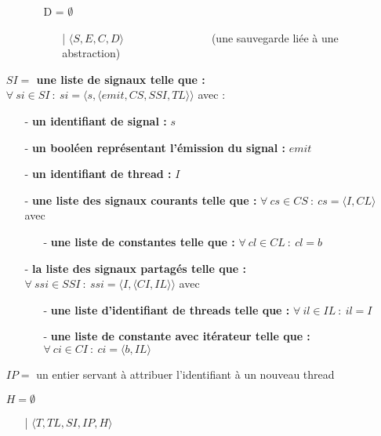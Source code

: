 \documentclass[10pt,a4paper]{report}
\begin{document}
\begin{itemize}
\begin{itemize}
\begin{itemize}
\begin{itemize}
				\end{itemize}
				\item[] D = $\emptyset$
				\begin{itemize}
					\item[|] $\langle S,E,C,D\rangle$~~~~~~~~~~~~~~~~(une sauvegarde liée à une abstraction)
				\end{itemize}
			\end{itemize}	
		\end{itemize}
		
		\item[]
		\item[] \textbf{$SI =$ une liste de signaux telle que :} $\forall~si \in SI~:~si = \langle s,\langle emit,CS,SSI,TL\rangle\rangle$ avec :
		\begin{itemize}
			\item[] - \textbf{un identifiant de signal :} $s$
			\item[] - \textbf{un booléen représentant l'émission du signal :} $emit$
			\item[] - \textbf{un identifiant de thread :} $I$
			\item[] - \textbf{une liste des signaux courants telle que :} $\forall~cs \in CS~:~cs = \langle I,CL\rangle$ avec 
			\begin{itemize}
				\item[] - \textbf{une liste de constantes telle que :} $\forall~cl \in CL~:~cl = b$
			\end{itemize}
			
			\item[] - \textbf{la liste des signaux partagés telle que :} $\forall~ssi \in SSI~:~ssi = \langle I,\langle CI,IL\rangle\rangle$ avec 
			\begin{itemize}
				\item[] - \textbf{une liste d'identifiant de threads telle que :} $\forall~il \in IL~:~il = I$
				\item[] - \textbf{une liste de constante avec itérateur telle que :} $\forall~ci \in CI~:~ci = \langle b, IL\rangle$
			\end{itemize}
		\end{itemize}
		\item[]
		\item[] $IP =$ un entier servant à attribuer l'identifiant à un nouveau thread 
		\item[] $H = \emptyset$
		\begin{itemize}
			\item[|] $\langle T,TL,SI,IP,H\rangle$
		\end{itemize}
	\end{itemize}
	\bigbreak
	
\end{document}
